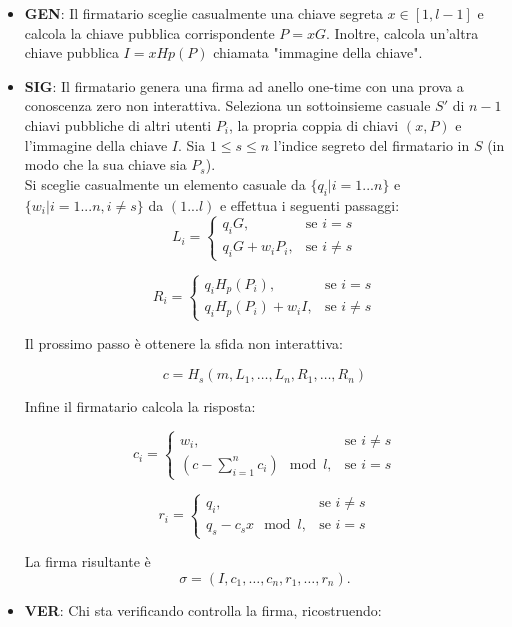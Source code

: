 \begin{itemize}
  \item
    \textbf{GEN}: Il firmatario sceglie casualmente una chiave segreta $x \in
    [1,l-1]$ e calcola la chiave pubblica corrispondente $P=xG$. Inoltre,
    calcola un'altra chiave pubblica $I=xHp(P)$ chiamata
    "immagine della chiave".
  \item
    \textbf{SIG}: Il firmatario genera una firma ad anello one-time con
    una prova a conoscenza zero non interattiva. Seleziona un sottoinsieme
    casuale $S'$ di $n - 1$ chiavi pubbliche di altri utenti $P_i$,
    la propria coppia di chiavi $(x, P)$ e l'immagine della
    chiave $I$. Sia $1 \leq s \leq n$ l'indice segreto del firmatario in
    $S$ (in modo che la sua chiave sia $P_s$).\\
    Si sceglie casualmente un elemento casuale da $\{q_i | i = 1
    ... n\}$ e $\{w_i | i = 1 ... n, i \neq s\}$ da $(1 ... l)$ e effettua
    i seguenti passaggi:
    \[ L_i = \begin{cases} q_iG, & \text{se } i = s \\ q_iG+w_iP_i, & \text{se } i \neq s \end{cases} \]


\[ R_i = \begin{cases} q_iH_p(P_i), & \text{se } i = s \\ q_iH_p(P_{i})+ w_iI, & \text{se } i \neq s \end{cases} \]

Il prossimo passo è ottenere la sfida non interattiva:

\[ c = H_s(m, L_1, \ldots, L_n, R_1, \ldots, R_n) \]

Infine il firmatario calcola la risposta:

\[ c_i = \begin{cases} w_i, & \text{se } i \neq s \\ \left(c -\sum_{i=1}^{n} c_i\right) \mod l, & \text{se } i = s \end{cases} \]

\[ r_i = \begin{cases} q_i, & \text{se } i \neq s \\ q_s - c_sx \mod l ,& \text{se } i=s \end{cases} \]

La firma risultante è \[ \sigma= (I,c_1,\ldots,c_n,r_1,\ldots,r_n). \]

\item 
  \textbf{VER}: Chi sta verificando controlla la firma, ricostruendo:


\end{itemize}
